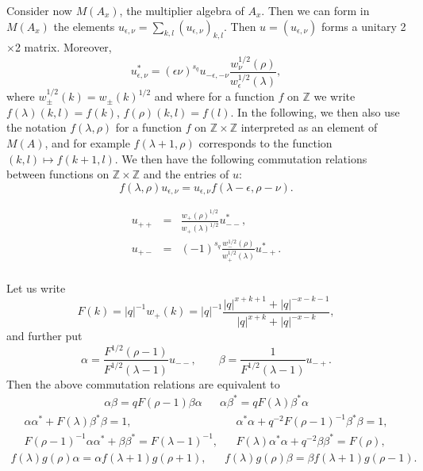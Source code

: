 \documentclass[12pt]{article}
\theoremstyle{change}
\newcommand{\Z}{\mathbb{Z}}
\theoremstyle{definition}
\numberwithin{equation}{section}
\begin{document}
Consider now $M(A_x)$, the multiplier algebra of $A_x$. Then we can form in $M(A_x)$ the elements $u_{\epsilon,\nu} = \sum_{k,l} (u_{\epsilon,\nu})_{k,l}$. Then $u=(u_{\epsilon,\nu})$ forms a unitary 2$\times$2 matrix. Moreover, \[u_{\epsilon,\nu}^* = (\epsilon\nu)^{s_q} u_{-\epsilon,-\nu}\frac{w_{\nu}^{1/2}(\rho)}{w_{\epsilon}^{1/2}(\lambda)} ,\] where $w_{\pm}^{1/2}(k) = w_{\pm}(k)^{1/2}$ and where for a function $f$ on $\Z$ we write $f(\lambda)(k,l) = f(k)$, $f(\rho)(k,l) = f(l)$. In the following, we then also use the notation $f(\lambda,\rho)$ for a function $f$ on $\Z\times \Z$ interpreted as an element of $M(A)$, and for example $f(\lambda+1,\rho)$ corresponds to the function $(k,l)\mapsto f(k+1,l)$. We then have the following commutation relations between functions on $\Z\times \Z$ and the entries of $u$: \[f(\lambda,\rho)u_{\epsilon,\nu} = u_{\epsilon,\nu}f(\lambda-\epsilon,\rho-\nu).\]



\begin{eqnarray*} u_{++} &=& \frac{w_+(\rho)^{1/2}}{w_+(\lambda)^{1/2}}u_{--}^*,\\u_{+-}&=& (-1)^{s_q}  \frac{w_-^{1/2}(\rho)}{w_+^{1/2}(\lambda)}u_{-+}^*.  \\ 
\end{eqnarray*}

Let us write \[F(k) = |q|^{-1}w_+(k) =  |q|^{-1}\frac{|q|^{x+k+1}+|q|^{-x-k-1}}{|q|^{x+k}+|q|^{-x-k}},\] and further put\[\alpha = \frac{F^{1/2}(\rho-1)}{F^{1/2}(\lambda-1)}u_{--},\qquad \beta = \frac{1}{F^{1/2}(\lambda-1)}u_{-+}.\] Then the above commutation relations are equivalent to \begin{align*} \alpha \beta = qF(\rho-1)\beta\alpha && \alpha\beta^* = qF(\lambda)\beta^*\alpha\end{align*} \begin{align*} \alpha\alpha^* +F(\lambda)\beta^*\beta = 1,&& \alpha^*\alpha+q^{-2}F(\rho-1)^{-1}\beta^*\beta = 1,\\ F(\rho-1)^{-1}\alpha\alpha^* +\beta\beta^* = F(\lambda-1)^{-1},&& F(\lambda)\alpha^*\alpha +q^{-2}\beta\beta^* = F(\rho),\end{align*} \begin{align*} f(\lambda)g(\rho)\alpha =
\alpha f(\lambda+1)g(\rho+1),&& f(\lambda)g(\rho)\beta = \beta f(\lambda+1)g(\rho-1).\end{align*}
\end{document}
